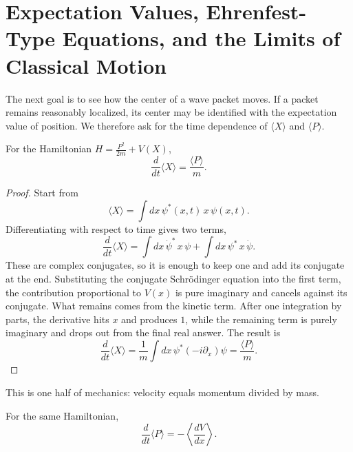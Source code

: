 \section{Expectation Values, Ehrenfest-Type Equations, and the Limits of Classical Motion}

The next goal is to see how the center of a wave packet moves. If a packet remains reasonably localized, its center may be identified with the expectation value of position. We therefore ask for the time dependence of \(\langle X\rangle\) and \(\langle P\rangle\).

\begin{proposition}
For the Hamiltonian \(H=\frac{P^2}{2m}+V(X)\),
\begin{equation}
\frac{d}{dt}\langle X\rangle=\frac{\langle P\rangle}{m}.
\end{equation}
\end{proposition}

\begin{proof}
Start from
\begin{equation}
\langle X\rangle=\int dx\,\psi^*(x,t)\,x\,\psi(x,t).
\end{equation}
Differentiating with respect to time gives two terms,
\begin{equation}
\frac{d}{dt}\langle X\rangle
=
\int dx\,\dot{\psi}^*\,x\,\psi
+
\int dx\,\psi^*\,x\,\dot{\psi}.
\end{equation}
These are complex conjugates, so it is enough to keep one and add its conjugate at the end. Substituting the conjugate Schr\"odinger equation into the first term, the contribution proportional to \(V(x)\) is pure imaginary and cancels against its conjugate. What remains comes from the kinetic term. After one integration by parts, the derivative hits \(x\) and produces \(1\), while the remaining term is purely imaginary and drops out from the final real answer. The result is
\begin{equation}
\frac{d}{dt}\langle X\rangle
=
\frac{1}{m}\int dx\,\psi^*(-i\partial_x)\psi
=
\frac{\langle P\rangle}{m}.
\end{equation}
\end{proof}

This is one half of mechanics: velocity equals momentum divided by mass.

\begin{proposition}
For the same Hamiltonian,
\begin{equation}
\frac{d}{dt}\langle P\rangle=-\left\langle \frac{dV}{dx}\right\rangle.
\end{equation}
\end{proposition}

